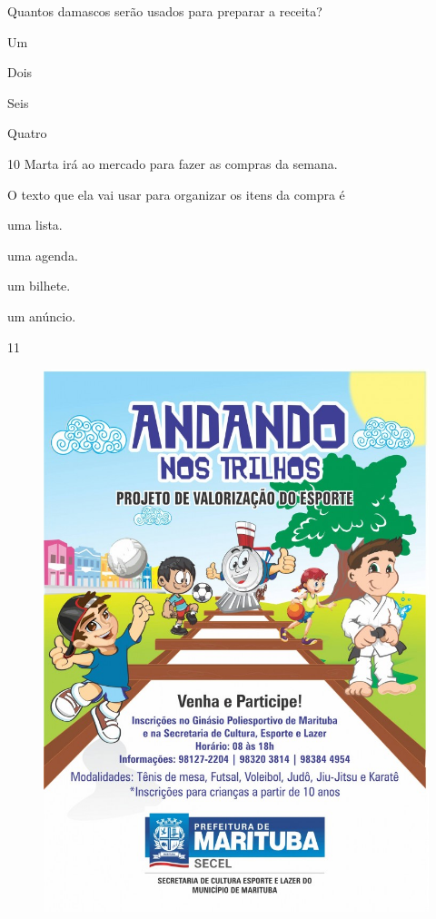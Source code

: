 Quantos damascos serão usados para preparar a receita?

\begin{escolha}
\item Um

\item Dois

\item Seis

\item Quatro
\end{escolha}


\num{10} Marta irá ao mercado para fazer as compras da semana.

O texto que ela vai usar para organizar os itens da compra é

\begin{escolha}
\item uma lista.

\item uma agenda.

\item um bilhete.

\item um anúncio.
\end{escolha}

\pagebreak
\num{11}

\begin{figure}[htpb!]
\centering
\includegraphics[width=.75\textwidth]{media/image170.jpeg}
\end{figure}

